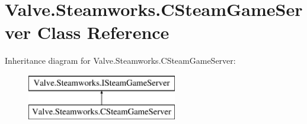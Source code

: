 \hypertarget{classValve_1_1Steamworks_1_1CSteamGameServer}{}\section{Valve.\+Steamworks.\+C\+Steam\+Game\+Server Class Reference}
\label{classValve_1_1Steamworks_1_1CSteamGameServer}
Inheritance diagram for Valve.\+Steamworks.\+C\+Steam\+Game\+Server\+:\begin{figure}[H]
\begin{center}
\leavevmode
\includegraphics[height=2.000000cm]{classValve_1_1Steamworks_1_1CSteamGameServer}
\end{center}
\end{figure}
